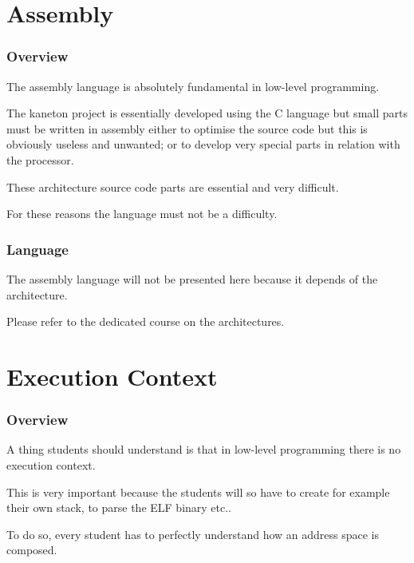 %
%

\section{Assembly}


\begin{frame}
  \frametitle{Overview}

  The assembly language is absolutely fundamental in low-level programming.

  \nl

  The kaneton project is essentially developed using the C language but
  small parts must be written in assembly either to optimise the source
  code but this is obviously useless and unwanted; or to develop very
  special parts in relation with the processor.

  \nl

  These architecture source code parts are essential and very difficult.

  \nl

  For these reasons the language must not be a difficulty.
\end{frame}


\begin{frame}
  \frametitle{Language}

  The assembly language will not be presented here because it depends
  of the architecture.

  \nl

  Please refer to the dedicated course on the architectures.
\end{frame}

%
%

\section{Execution Context}


\begin{frame}
  \frametitle{Overview}

  A thing students should understand is that in low-level programming
  there is no execution context.

  \nl

  This is very important because the students will so have to create for
  example their own stack, to parse the ELF binary etc..

  \nl

  To do so, every student has to perfectly understand how an address
  space is composed.
\end{frame}

